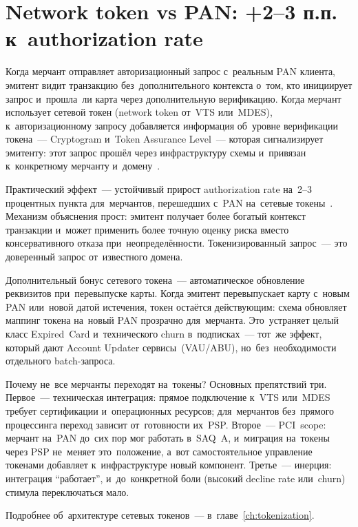 \section{Network token vs PAN: +2--3 п.п. к~authorization rate}
\label{sec:decline-tokens}

Когда мерчант отправляет авторизационный запрос с~реальным PAN клиента,
эмитент видит транзакцию без~дополнительного контекста о~том, кто инициирует
запрос и~прошла~ли карта через дополнительную верификацию. Когда мерчант
использует сетевой токен (network token от~VTS или~MDES), к~авторизационному
запросу добавляется информация об~уровне верификации токена~---
Cryptogram и~Token Assurance Level~--- которая сигнализирует эмитенту:
этот запрос прошёл через инфраструктуру схемы и~привязан к~конкретному
мерчанту и~домену~.

Практический эффект~--- устойчивый прирост authorization rate на~2--3
процентных пункта для~мерчантов, перешедших с~PAN на~сетевые
токены~.
Механизм объяснения прост: эмитент получает более богатый контекст транзакции
и~может применить более точную оценку риска вместо консервативного отказа
при~неопределённости. Токенизированный запрос~--- это доверенный запрос
от~известного домена.

Дополнительный бонус сетевого токена~--- автоматическое обновление
реквизитов при~перевыпуске карты. Когда эмитент перевыпускает карту
с~новым PAN или~новой датой истечения, токен остаётся действующим:
схема обновляет маппинг токена на~новый PAN прозрачно для~мерчанта.
Это~устраняет целый класс  Expired~Card и~технического churn
в~подписках~--- тот~же эффект, который дают Account Updater сервисы~(VAU/ABU),
но~без~необходимости отдельного batch-запроса.

Почему не~все мерчанты переходят на~токены? Основных препятствий три.
Первое~--- техническая интеграция: прямое подключение к~VTS или~MDES
требует сертификации и~операционных ресурсов; для~мерчантов без~прямого
процессинга переход зависит от~готовности их~PSP. Второе~--- PCI~scope:
мерчант на~PAN до~сих пор мог работать в~SAQ~A, и~миграция на~токены
через PSP не~меняет это~положение, а~вот самостоятельное управление
токенами добавляет к~инфраструктуре новый компонент. Третье~---
инерция: интеграция \enquote{работает}, и~до~конкретной боли (высокий
decline rate или~churn) стимула переключаться мало.

Подробнее об~архитектуре сетевых токенов~--- в~главе~\ref{ch:tokenization}.


